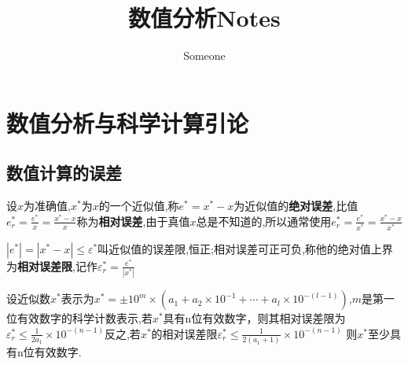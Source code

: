 \documentclass[10pt]{yerbaformat}
\title{数值分析Notes}
\date{}
\begin{document}
\author{Someone}
\maketitle
\tableofcontents
\footnotesize
\section{数值分析与科学计算引论}
\subsection{数值计算的误差}

\begin{definition}[绝对误差]
    设$x$为准确值,$x^{*}$为$x$的一个近似值,称$e^{*}=x^{*}-x$为近似值的\textbf{绝对误差},比值$e_{r}^{*}=\frac{e^{*}}{x}=\frac{x^{*}-x}{x}$称为\textbf{相对误差},由于真值$x$总是不知道的,所以通常使用$e_{r}^{*}=\frac{e^{*}}{x^{*}}=\frac{x^{*}-x}{x^{*}}$
\end{definition}

\begin{definition}[误差限]
    $\left|e^{*}\right|=\left|x^{*}-x\right|\leq\varepsilon^{*}$叫近似值的误差限,恒正;相对误差可正可负,称他的绝对值上界为\textbf{相对误差限},记作$\varepsilon_{r}^{*}=\frac{e^{*}}{\left|x^{*}\right|}$
\end{definition}

\begin{theorem}[有效数字与相对误差]
    设近似数$x^{*}$表示为$x^{*}=\pm10^{m}\times\left(a_{1}+a_{2}\times10^{-1}+\cdots+a_{l}\times10^{-(l-1)}\right)$,$m$是第一位有效数字的科学计数表示,若$x^{*}$具有n位有效数字，则其相对误差限为$\varepsilon_{r}^{*}\leq\frac{1}{2a_{1}}\times10^{-(n-1)}$反之,若$x^{*}$的相对误差限$\varepsilon_{r}^{*}\leq\frac{1}{2\left(a_{1}+1\right)}\times10^{-(n-1)}$
    则$x^{*}$至少具有n位有效数字.
\end{theorem}
\end{document}
